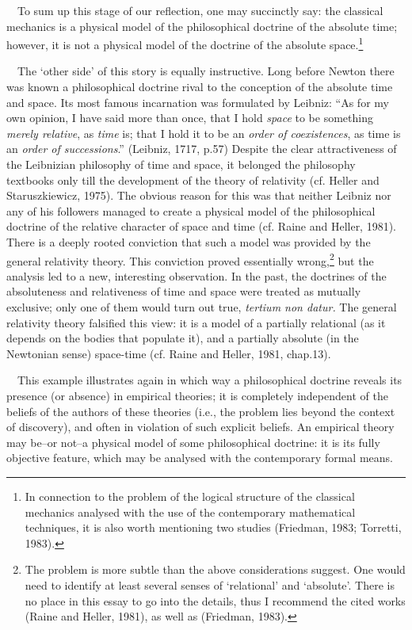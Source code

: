 \documentclass[a4paper]{article}
\begin{document}
\ \ To sum up this stage of our reflection, one may succinctly say: the classical mechanics is a physical model of the
philosophical doctrine of the absolute time; however, it is not a physical model of the doctrine of the absolute
space.\footnote{In connection to the problem of the logical structure of the classical mechanics analysed with the use
of the contemporary mathematical techniques, it is also worth mentioning two studies
\label{ref:RNDIYv6tEO5va}(Friedman, 1983; Torretti, 1983).}

\ \ The ‘other side’ of this story is equally instructive. Long before Newton there was known a philosophical doctrine
rival to the conception of the absolute time and space. Its most famous incarnation was formulated by Leibniz: “As for
my own opinion, I have said more than once, that I hold \textit{space} to be something \textit{merely relative}, as
\textit{time }is; that I hold it to be an \textit{order of coexistences}, as time is an \textit{order of successions}.”
\label{ref:RNDRSL4adjdiS}(Leibniz, 1717, p.57) Despite the clear attractiveness of the Leibnizian philosophy of time
and space, it belonged the philosophy textbooks only till the development of  the theory of relativity
\label{ref:RNDn9tYnMyJ9c}(cf. Heller and Staruszkiewicz, 1975). The obvious reason for this was that neither Leibniz
nor any of his followers managed to create a physical model of the philosophical doctrine of the relative character of
space and time \label{ref:RNDlDZpjVPVrx}(cf. Raine and Heller, 1981). There is a deeply rooted conviction that such a
model was provided by the general relativity theory. This conviction proved essentially wrong,\footnote{The problem is
more subtle than the above considerations suggest. One would need to identify at least several senses of ‘relational’
and ‘absolute’. There is no place in this essay to go into the details, thus I recommend the cited works
\label{ref:RNDRTE2UAbuq1}(Raine and Heller, 1981), as well as \label{ref:RNDf9yHzW0dHY}(Friedman, 1983).} but the
analysis led to a new, interesting observation. In the past, the doctrines of the absoluteness and relativeness of time
and space were treated as mutually exclusive; only one of them would turn out true, \textit{tertium non datur. }The
general relativity theory falsified this view: it is a model of a partially relational (as it depends on the bodies
that populate it), and a partially absolute (in the Newtonian sense) space-time \label{ref:RNDxfuOAfIRMd}(cf. Raine and
Heller, 1981, chap.13).

\ \ This example illustrates again in which way a philosophical doctrine reveals its presence (or absence) in empirical
theories; it is completely independent of the beliefs of the authors of these theories (i.e., the problem lies beyond
the context of discovery), and often in violation of such explicit beliefs. An empirical theory may be–or not–a
physical model of some philosophical doctrine: it is its fully objective feature, which may be analysed with the
contemporary formal means.
\end{document}
